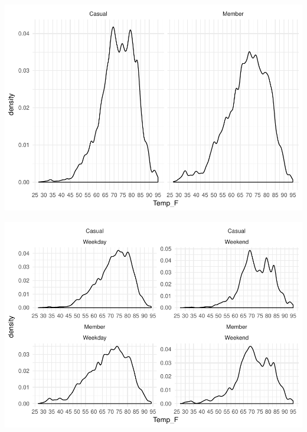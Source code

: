 \documentclass[]{article}
\newenvironment{Shaded}{\begin{snugshade}}{\end{snugshade}}
\newcommand{\KeywordTok}[1]{\textcolor[rgb]{0.13,0.29,0.53}{\textbf{#1}}}
\newcommand{\DataTypeTok}[1]{\textcolor[rgb]{0.13,0.29,0.53}{#1}}
\newcommand{\DecValTok}[1]{\textcolor[rgb]{0.00,0.00,0.81}{#1}}
\newcommand{\StringTok}[1]{\textcolor[rgb]{0.31,0.60,0.02}{#1}}
\newcommand{\CommentTok}[1]{\textcolor[rgb]{0.56,0.35,0.01}{\textit{#1}}}
\newcommand{\OperatorTok}[1]{\textcolor[rgb]{0.81,0.36,0.00}{\textbf{#1}}}
\newcommand{\NormalTok}[1]{#1}
\begin{document}
\includegraphics{Nice_Ride_Project_Stat_ReportDRAFT_files/figure-latex/unnamed-chunk-11-2.pdf}

\begin{Shaded}
\end{Shaded}

\includegraphics{Nice_Ride_Project_Stat_ReportDRAFT_files/figure-latex/unnamed-chunk-11-3.pdf}
\end{document}
